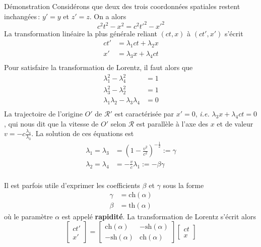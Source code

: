         \begin{demo}{Démonstration}
            Considérons que deux des trois coordonnées spatiales restent inchangées : $y' = y$ et $z' = z$. On a alors 
            \[ c^2 t^2 - x^2 = c^2 t'^2 - x'^2 \]   
            La transformation linéaire la plus générale reliant $(ct, x)$ à $(ct', x')$ s’écrit 
        \begin{align*}
            ct' &= \lambda_1 ct + \lambda_2 x \\
            x' &= \lambda_3 x + \lambda_4 ct \\
        \end{align*}
        Pour satisfaire la transformation de Lorentz, il faut alors que
        \begin{align*}
            \lambda_1^2 - \lambda_4^2 &= 1 \\
            \lambda_3^2 - \lambda_2^2 &= 1 \\
            \lambda_1 \lambda_2 - \lambda_3 \lambda_4 &= 0 \\
        \end{align*}
        La trajectoire de l’origine $O'$ de $\mathcal{R}'$ est caractérisée par $x' = 0$, \textit{i.e.} $\lambda_3 x + \lambda_4 ct = 0$, qui nous dit que la vitesse de $O'$ selon $\mathcal{R}$ est parallèle à l’axe des $x$ et de valeur $v = -c \frac{\lambda_4}{\lambda_3}$. La solution de ces équations est
        \begin{align*}
            \lambda_1 = \lambda_3 &= \left(1 - \frac{v^2}{c^2}\right)^{-\frac{1}{2}} := \gamma \\
            \lambda_2 = \lambda_4 &= - \frac{v}{c} \lambda_1 := - \beta \gamma \\
        \end{align*}
        \end{demo}

        Il est parfois utile d’exprimer les coefficients $\beta$ et $\gamma$ sous la forme 
        \begin{align*}
            \gamma &= \text{ch}(\alpha) \\
            \beta &= \text{th}(\alpha)
        \end{align*}
        où le paramètre $\alpha$ est appelé \textbf{rapidité}. La transformation de Lorentz s’écrit alors 
        \[ \begin{bmatrix}
            ct' \\
            x'
        \end{bmatrix} = \begin{bmatrix}
            \text{ch}(\alpha) & -\text{sh}(\alpha) \\
            -\text{sh}(\alpha) & \text{ch}(\alpha)
        \end{bmatrix} \begin{bmatrix}
            ct \\
            x
        \end{bmatrix} \]

